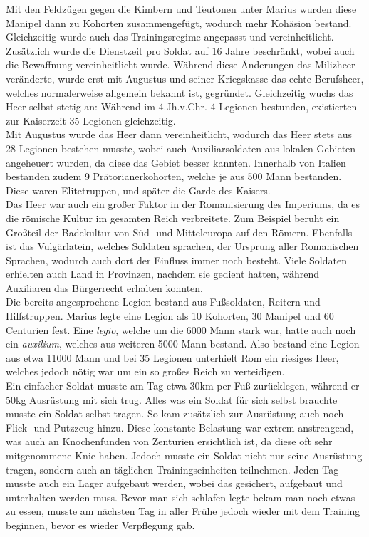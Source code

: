 \documentclass{article}
\begin{document}
	Mit den Feldzügen gegen die Kimbern und Teutonen unter Marius wurden diese Manipel dann zu Kohorten zusammengefügt, wodurch mehr Kohäsion bestand. Gleichzeitig wurde auch das Trainingsregime angepasst und vereinheitlicht. Zusätzlich wurde die Dienstzeit pro Soldat auf 16 Jahre beschränkt, wobei auch die Bewaffnung vereinheitlicht wurde. Während diese Änderungen das Milizheer veränderte, wurde erst mit Augustus und seiner Kriegskasse das echte Berufsheer, welches normalerweise allgemein bekannt ist, gegründet. Gleichzeitig wuchs das Heer selbst stetig an: Während im 4.Jh.v.Chr. 4 Legionen bestunden, existierten zur Kaiserzeit 35 Legionen gleichzeitig. \\
	Mit Augustus wurde das Heer dann vereinheitlicht, wodurch das Heer stets aus 28 Legionen bestehen musste, wobei auch Auxiliarsoldaten aus lokalen Gebieten angeheuert wurden, da diese das Gebiet besser kannten. Innerhalb von Italien bestanden zudem 9 Prätorianerkohorten, welche je aus 500 Mann bestanden. Diese waren Elitetruppen, und später die Garde des Kaisers. \\
	Das Heer war auch ein großer Faktor in der Romanisierung des Imperiums, da es die römische Kultur im gesamten Reich verbreitete. Zum Beispiel beruht ein Großteil der Badekultur von Süd- und Mitteleuropa auf den Römern. Ebenfalls ist das Vulgärlatein, welches Soldaten sprachen, der Ursprung aller Romanischen Sprachen, wodurch auch dort der Einfluss immer noch besteht. Viele Soldaten erhielten auch Land in Provinzen, nachdem sie gedient hatten, während Auxiliaren das Bürgerrecht erhalten konnten. \\
	Die bereits angesprochene Legion bestand aus Fußsoldaten, Reitern und Hilfstruppen. Marius legte eine Legion als 10 Kohorten, 30 Manipel und 60 Centurien fest. Eine \textit{legio}, welche um die 6000 Mann stark war, hatte auch noch ein \textit{auxilium}, welches aus weiteren 5000 Mann bestand. Also bestand eine Legion aus etwa 11000 Mann und bei 35 Legionen unterhielt Rom ein riesiges Heer, welches jedoch nötig war um ein so großes Reich zu verteidigen. \\
	Ein einfacher Soldat musste am Tag etwa 30km per Fuß zurücklegen, während er 50kg Ausrüstung mit sich trug. Alles was ein Soldat für sich selbst brauchte musste ein Soldat selbst tragen. So kam zusätzlich zur Ausrüstung auch noch Flick- und Putzzeug hinzu. Diese konstante Belastung war extrem anstrengend, was auch an Knochenfunden von Zenturien ersichtlich ist, da diese oft sehr mitgenommene Knie haben. Jedoch musste ein Soldat nicht nur seine Ausrüstung tragen, sondern auch an täglichen Trainingseinheiten teilnehmen. Jeden Tag musste auch ein Lager aufgebaut werden, wobei das gesichert, aufgebaut und unterhalten werden muss. Bevor man sich schlafen legte bekam man noch etwas zu essen, musste am nächsten Tag in aller Frühe jedoch wieder mit dem Training beginnen, bevor es wieder Verpflegung gab. \\
\end{document}
